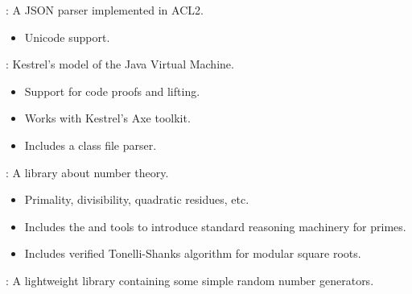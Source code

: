 
\begin{frame}

\newlibtitle

:
A JSON parser implemented in ACL2.
\begin{itemize}
\item Unicode support.
\end{itemize}

\end{frame}


\begin{frame}

\newlibtitle

:
Kestrel's model of the Java Virtual Machine.
\begin{itemize}
\item Support for code proofs and lifting.
\item Works with Kestrel's Axe toolkit.
\item Includes a class file parser.
\end{itemize}

\end{frame}


\begin{frame}

\newlibtitle

:
A library about number theory.
\begin{itemize}
\item Primality, divisibility, quadratic residues, etc.
\item Includes the  and  tools to
  introduce standard reasoning machinery for primes.
\item Includes verified Tonelli-Shanks algorithm for modular square roots.
\end{itemize}

\end{frame}


\begin{frame}

\newlibtitle

:
A lightweight library containing some simple random number generators.

\end{frame}

